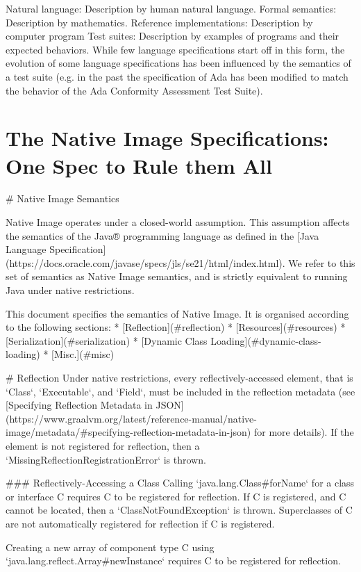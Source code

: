     Natural language: Description by human natural language.
    Formal semantics: Description by mathematics.
    Reference implementations: Description by computer program
    Test suites: Description by examples of programs and their expected behaviors. While few language specifications start off in this form, the evolution of some language specifications has been influenced by the semantics of a test suite (e.g. in the past the specification of Ada has been modified to match the behavior of the Ada Conformity Assessment Test Suite).

\chapter{The Native Image Specifications: One Spec to Rule them All}
# Native Image Semantics

Native Image operates under a closed-world assumption. This assumption affects the semantics of the 
Java® programming language as defined in the 
[Java Language Specification](https://docs.oracle.com/javase/specs/jls/se21/html/index.html).
We refer to this set of semantics as Native Image semantics, and is strictly equivalent to running
Java under native restrictions.

This document specifies the semantics of Native Image.
It is organised according to the following sections:
* [Reflection](#reflection)
* [Resources](#resources)
* [Serialization](#serialization)
* [Dynamic Class Loading](#dynamic-class-loading)
* [Misc.](#misc)

# Reflection
Under native restrictions, every reflectively-accessed element, that is `Class`, `Executable`, and `Field`, must 
be included in the reflection metadata (see [Specifying Reflection Metadata in JSON](https://www.graalvm.org/latest/reference-manual/native-image/metadata/#specifying-reflection-metadata-in-json)
for more details). If the element is not registered for reflection, then a `MissingReflectionRegistrationError` is thrown.

### Reflectively-Accessing a Class
Calling `java.lang.Class#forName` for a class or interface C requires C to be registered for reflection.
If C is registered, and C cannot be located, then a `ClassNotFoundException` is thrown. 
Superclasses of C are not automatically registered for reflection if C is registered.

Creating a new array of component type C using `java.lang.reflect.Array#newInstance` requires C to be 
registered for reflection.

